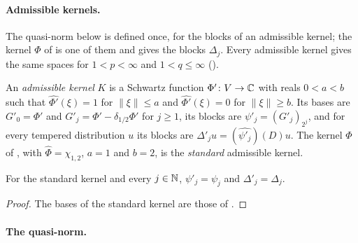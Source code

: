 \paragraph{Admissible kernels.}
The quasi-norm below is defined once, for the blocks of an admissible kernel; the kernel $\Phi$
of  is one of them and gives the blocks $\Delta_j$. Every admissible kernel
gives the same spaces for $1 < p < \infty$ and $1 < q \leq \infty$
().

\begin{definition}
\label{def:lp-kernel-admissible}
\leanok
{}
An \emph{admissible kernel} $K$ is a Schwartz function $\Phi' \colon V \to \mathbb{C}$ with reals
$0 < a < b$ such that $\widehat{\Phi'}(\xi) = 1$ for $\|\xi\| \leq a$ and
$\widehat{\Phi'}(\xi) = 0$ for $\|\xi\| \geq b$. Its bases are $G'_0 = \Phi'$ and
$G'_j = \Phi' - \delta_{1/2} \Phi'$ for $j \geq 1$, its blocks are $\psi'_j = (G'_j)_{2^j}$, and
for every tempered distribution $u$ its blocks are $\Delta'_j u = (\widehat{\psi'_j})(D) u$. The
kernel $\Phi$ of , with $\widehat\Phi = \chi_{1,2}$, $a = 1$ and $b = 2$, is
the \emph{standard} admissible kernel.
\end{definition}

\begin{lemma}
\label{lem:lp-kernel-standard-blocks}
\leanok
{}
For the standard kernel and every $j \in \mathbb{N}$, $\psi'_j = \psi_j$ and $\Delta'_j = \Delta_j$.
\end{lemma}

\begin{proof}
\leanok
The bases of the standard kernel are those of .
\end{proof}

\paragraph{The quasi-norm.}

